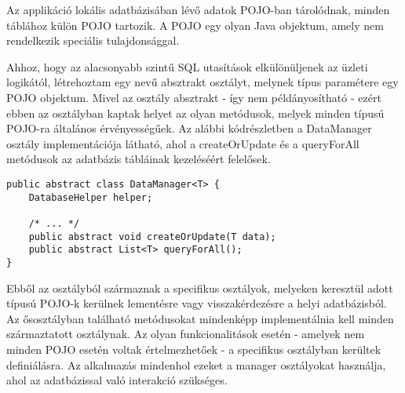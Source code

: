 Az applikáció lokális adatbázisában lévő adatok POJO-ban tárolódnak, minden táblához külön POJO tartozik.
A POJO egy olyan Java objektum, amely nem rendelkezik speciális tulajdonsággal.

Ahhoz, hogy az alacsonyabb szintű SQL utasítások elkülönüljenek az üzleti logikától, létrehoztam egy  nevű absztrakt osztályt, melynek típus paramétere egy POJO objektum. 
Mivel az osztály absztrakt - így nem példányosítható - ezért ebben az osztályban kaptak helyet az olyan metódusok, melyek minden típusú POJO-ra általános érvényességűek. 
Az alábbi kódrészletben a DataManager osztály implementációja látható, ahol a createOrUpdate és a queryForAll metódusok az adatbázis tábláinak kezeléséért felelősek.
\begin{lstlisting}
public abstract class DataManager<T> {	
    DatabaseHelper helper;
	
	/* ... */
    public abstract void createOrUpdate(T data);
    public abstract List<T> queryForAll();
}
\end{lstlisting} 
Ebből az osztályból származnak a specifikus osztályok, melyeken keresztül adott típusú POJO-k kerülnek lementésre vagy visszakérdezésre a helyi adatbázisból.
Az ősosztályban található metódusokat mindenképp implementálnia kell minden származtatott osztálynak. 
Az olyan funkcionalitások esetén - amelyek nem minden POJO esetén voltak értelmezhetőek - a specifikus osztályban kerültek definiálásra.
Az alkalmazás mindenhol ezeket a manager osztályokat használja, ahol az adatbázissal való interakció szükséges.


